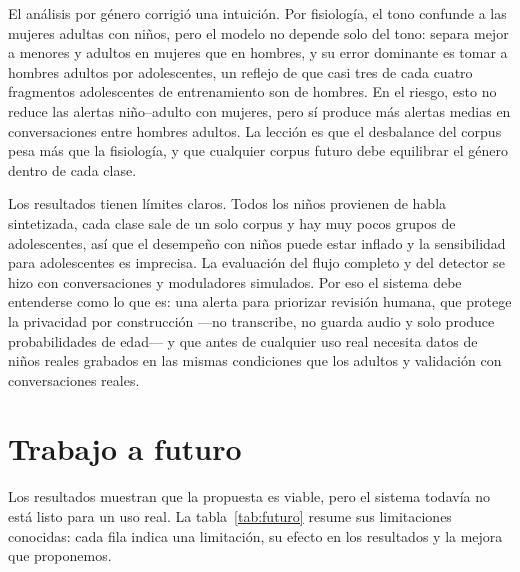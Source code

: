 \documentclass[11pt,a4paper]{article}
\begin{document}
El análisis por género corrigió una intuición. Por fisiología, el tono confunde a las mujeres adultas con niños, pero el modelo no depende solo del tono: separa mejor a menores y adultos en mujeres que en hombres, y su error dominante es tomar a hombres adultos por adolescentes, un reflejo de que casi tres de cada cuatro fragmentos adolescentes de entrenamiento son de hombres. En el riesgo, esto no reduce las alertas niño--adulto con mujeres, pero sí produce más alertas medias en conversaciones entre hombres adultos. La lección es que el desbalance del corpus pesa más que la fisiología, y que cualquier corpus futuro debe equilibrar el género dentro de cada clase.

Los resultados tienen límites claros. Todos los niños provienen de habla sintetizada, cada clase sale de un solo corpus y hay muy pocos grupos de adolescentes, así que el desempeño con niños puede estar inflado y la sensibilidad para adolescentes es imprecisa. La evaluación del flujo completo y del detector se hizo con conversaciones y moduladores simulados. Por eso el sistema debe entenderse como lo que es: una alerta para priorizar revisión humana, que protege la privacidad por construcción ---no transcribe, no guarda audio y solo produce probabilidades de edad--- y que antes de cualquier uso real necesita datos de niños reales grabados en las mismas condiciones que los adultos y validación con conversaciones reales.

\section{Trabajo a futuro}

Los resultados muestran que la propuesta es viable, pero el sistema todavía no está listo para un uso real. La tabla~\ref{tab:futuro} resume sus limitaciones conocidas: cada fila indica una limitación, su efecto en los resultados y la mejora que proponemos.
\end{document}
